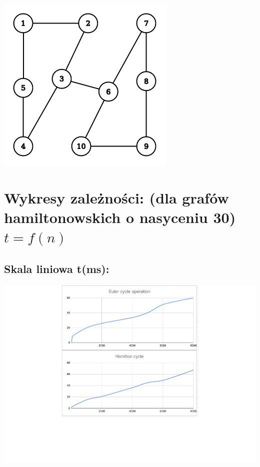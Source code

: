 \documentclass[12pt]{article}
\begin{document}
\begin{center}

\includegraphics[scale=0.5]{graph_non_hamilton.png}

\end{center}

\section{Wykresy zależności: (dla grafów hamiltonowskich o nasyceniu 30) $ t = f(n) $}

\subsection{Skala liniowa t(ms): }

\begin{center}

\includegraphics[scale=0.5]{wykres_liniowy_0.pdf}

\end{center}
\end{document}
